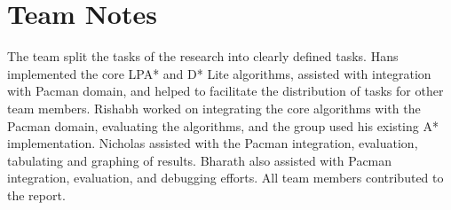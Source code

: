 \section{Team Notes}
The team split the tasks of the research into clearly defined tasks. Hans implemented the core LPA* and D* Lite algorithms, assisted with integration with Pacman domain, and helped to facilitate the distribution of tasks for other team members. Rishabh worked on integrating the core algorithms with the Pacman domain, evaluating the algorithms, and the group used his existing A* implementation. Nicholas assisted with the Pacman integration, evaluation, tabulating and graphing of results. Bharath also assisted with Pacman integration, evaluation, and debugging efforts. All team members contributed to the report.